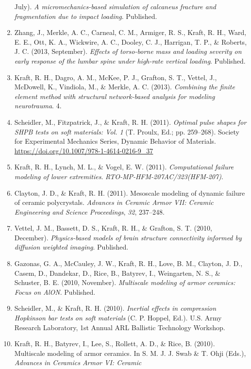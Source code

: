 \documentclass[
]{article}
\begin{document}
\begin{enumerate}
  July). \emph{A micromechanics-based simulation of calcaneus fracture
  and fragmentation due to impact loading}. Published.
\item
  Zhang, J., Merkle, A. C., Carneal, C. M., Armiger, R. S., Kraft, R.
  H., Ward, E. E., Ott, K. A., Wickwire, A. C., Dooley, C. J., Harrigan,
  T. P., \& Roberts, J. C. (2013, September). \emph{Effects of
  torso-borne mass and loading severity on early response of the lumbar
  spine under high-rate vertical loading}. Published.
\item
  Kraft, R. H., Dagro, A. M., McKee, P. J., Grafton, S. T., Vettel, J.,
  McDowell, K., Vindiola, M., \& Merkle, A. C. (2013). \emph{Combining
  the finite element method with structural network-based analysis for
  modeling neurotrauma}. 4.
\item
  Scheidler, M., Fitzpatrick, J., \& Kraft, R. H. (2011). \emph{Optimal
  pulse shapes for SHPB tests on soft materials: Vol. 1} (T. Proulx,
  Ed.; pp. 259--268). Society for Experimental Mechanics Series, Dynamic
  Behavior of Materials.
  \url{https://doi.org/10.1007/978-1-4614-0216-9_37}
\item
  Kraft, R. H., Lynch, M. L., \& Vogel, E. W. (2011).
  \emph{Computational failure modeling of lower extremities}.
  \emph{RTO-MP-HFM-207AC/323(HFM-207)}.
\item
  Clayton, J. D., \& Kraft, R. H. (2011). Mesoscale modeling of dynamic
  failure of ceramic polycrystals. \emph{Advances in Ceramic Armor VII:
  Ceramic Engineering and Science Proceedings}, \emph{32}, 237--248.
\item
  Vettel, J. M., Bassett, D. S., Kraft, R. H., \& Grafton, S. T. (2010,
  December). \emph{Physics-based models of brain structure connectivity
  informed by diffusion weighted imaging}. Published.
\item
  Gazonas, G. A., McCauley, J. W., Kraft, R. H., Love, B. M., Clayton,
  J. D., Casem, D., Dandekar, D., Rice, B., Batyrev, I., Weingarten, N.
  S., \& Schuster, B. E. (2010, November). \emph{Multiscale modeling of
  armor ceramics: Focus on AlON}. Published.
\item
  Scheidler, M., \& Kraft, R. H. (2010). \emph{Inertial effects in
  compression Hopkinson bar tests on soft materials} (C. P. Hoppel,
  Ed.). U.S. Army Research Laboratory, 1st Annual ARL Ballistic
  Technology Workshop.
\item
  Kraft, R. H., Batyrev, I., Lee, S., Rollett, A. D., \& Rice, B.
  (2010). Multiscale modeling of armor ceramics. In S. M. J. J. Swab \&
  T. Ohji (Eds.), \emph{Advances in Ceramics Armor VI: Ceramic
}
\end{enumerate}
\end{document}
